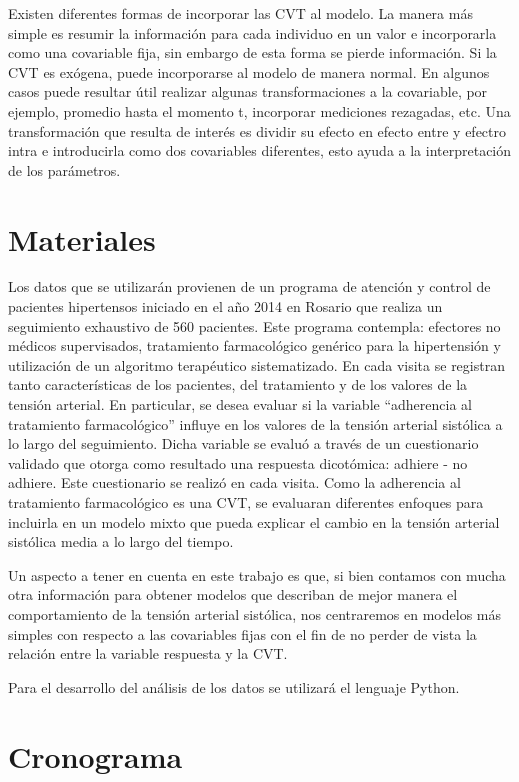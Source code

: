 \documentclass[12pt]{article}
\def\npatients{560}
\begin{document}
Existen diferentes formas de incorporar las CVT al modelo. La manera más simple es
resumir la información para cada individuo en un valor e incorporarla como una covariable
fija, sin embargo de esta forma se pierde información. Si la CVT es exógena, puede
incorporarse al modelo de manera normal. En algunos casos puede resultar útil realizar
algunas transformaciones a la covariable, por ejemplo, promedio hasta el momento t,
incorporar mediciones rezagadas, etc. Una transformación que resulta de interés es dividir
su efecto en efecto entre y efectro intra e introducirla como dos covariables diferentes,
esto ayuda a la interpretación de los parámetros.

\newpage
\section{Materiales}

Los datos que se utilizarán provienen de un programa de atención y control de pacientes hipertensos iniciado en el año 2014
en Rosario que realiza un seguimiento exhaustivo de \npatients{} pacientes. Este programa contempla: efectores no médicos
supervisados, tratamiento farmacológico genérico para la hipertensión y utilización de un algoritmo terapéutico sistematizado.
En cada visita se registran tanto características de los pacientes, del tratamiento y de los valores de la tensión arterial.
En particular, se desea evaluar si la variable ``adherencia al tratamiento farmacológico'' influye en los valores de la tensión arterial
sistólica a lo largo del seguimiento. Dicha variable se evaluó a través de un cuestionario validado que otorga como resultado
una respuesta dicotómica: adhiere - no adhiere. Este cuestionario se realizó en cada visita. Como la adherencia al tratamiento
farmacológico es una CVT, se evaluaran diferentes enfoques para incluirla en un modelo mixto que pueda explicar el cambio
en la tensión arterial sistólica media a lo largo del tiempo.

Un aspecto a tener en cuenta en este trabajo es que, si bien contamos con mucha otra información para obtener modelos
que describan de mejor manera el comportamiento de la tensión arterial sistólica, nos centraremos en modelos más simples con
respecto a las covariables fijas con el fin de no perder de vista la relación entre la variable respuesta y la CVT.

Para el desarrollo del análisis de los datos se utilizará el lenguaje Python.

\newpage
\section{Cronograma}
\end{document}
